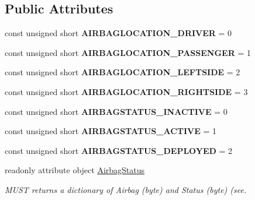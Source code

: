 \subsection*{Public Attributes}
\begin{DoxyCompactItemize}
\item 
\hypertarget{interfaceVehicle_1_1AirbagStatus_ad1a9ac1b7f578e752c02754cce00505c}{const unsigned short {\bfseries A\-I\-R\-B\-A\-G\-L\-O\-C\-A\-T\-I\-O\-N\-\_\-\-D\-R\-I\-V\-E\-R} = 0}\label{interfaceVehicle_1_1AirbagStatus_ad1a9ac1b7f578e752c02754cce00505c}

\item 
\hypertarget{interfaceVehicle_1_1AirbagStatus_a0641460bfebbbe544e825bba31df8ec5}{const unsigned short {\bfseries A\-I\-R\-B\-A\-G\-L\-O\-C\-A\-T\-I\-O\-N\-\_\-\-P\-A\-S\-S\-E\-N\-G\-E\-R} = 1}\label{interfaceVehicle_1_1AirbagStatus_a0641460bfebbbe544e825bba31df8ec5}

\item 
\hypertarget{interfaceVehicle_1_1AirbagStatus_a58afa13ba1700ee5387f766b25b6a8f8}{const unsigned short {\bfseries A\-I\-R\-B\-A\-G\-L\-O\-C\-A\-T\-I\-O\-N\-\_\-\-L\-E\-F\-T\-S\-I\-D\-E} = 2}\label{interfaceVehicle_1_1AirbagStatus_a58afa13ba1700ee5387f766b25b6a8f8}

\item 
\hypertarget{interfaceVehicle_1_1AirbagStatus_a820eaffc64a2546fa4d0f8b3ca917c9b}{const unsigned short {\bfseries A\-I\-R\-B\-A\-G\-L\-O\-C\-A\-T\-I\-O\-N\-\_\-\-R\-I\-G\-H\-T\-S\-I\-D\-E} = 3}\label{interfaceVehicle_1_1AirbagStatus_a820eaffc64a2546fa4d0f8b3ca917c9b}

\item 
\hypertarget{interfaceVehicle_1_1AirbagStatus_ab1fab419a0eeb57346d7c058579e8368}{const unsigned short {\bfseries A\-I\-R\-B\-A\-G\-S\-T\-A\-T\-U\-S\-\_\-\-I\-N\-A\-C\-T\-I\-V\-E} = 0}\label{interfaceVehicle_1_1AirbagStatus_ab1fab419a0eeb57346d7c058579e8368}

\item 
\hypertarget{interfaceVehicle_1_1AirbagStatus_a7b82215fe8fb71f45430de2951f53fac}{const unsigned short {\bfseries A\-I\-R\-B\-A\-G\-S\-T\-A\-T\-U\-S\-\_\-\-A\-C\-T\-I\-V\-E} = 1}\label{interfaceVehicle_1_1AirbagStatus_a7b82215fe8fb71f45430de2951f53fac}

\item 
\hypertarget{interfaceVehicle_1_1AirbagStatus_a59b98e46b9db09849b80582e496ec6c0}{const unsigned short {\bfseries A\-I\-R\-B\-A\-G\-S\-T\-A\-T\-U\-S\-\_\-\-D\-E\-P\-L\-O\-Y\-E\-D} = 2}\label{interfaceVehicle_1_1AirbagStatus_a59b98e46b9db09849b80582e496ec6c0}

\item 
readonly attribute object \hyperlink{interfaceVehicle_1_1AirbagStatus_a87cf77029f8953da28ebff9241174cfd}{Airbag\-Status}
\begin{DoxyCompactList}\small\item\em M\-U\-S\-T returns a dictionary of Airbag (byte) and Status (byte) (see. \end{DoxyCompactList}\end{DoxyCompactItemize}
